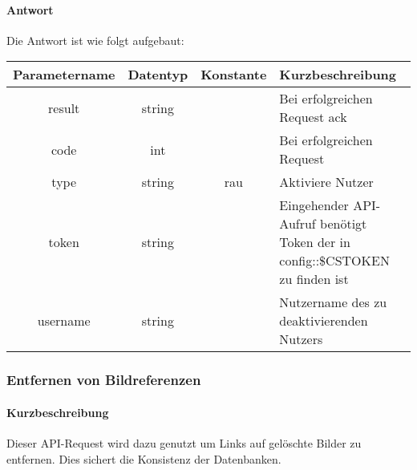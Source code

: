 \paragraph{Antwort}Die Antwort ist wie folgt aufgebaut:
\begin{table}[H]
	\begin{tabular}{|c|c|c|p{6.5cm}|}
		\hline
		\textbf{Parametername} & \textbf{Datentyp} & \textbf{Konstante} & \textbf{Kurzbeschreibung}                                                                                               \\ \hline
		result              & string            &                    & Bei erfolgreichen Request {\glqq ack\grqq}                                                                            \\ \hline
		code                & int               &                    & Bei erfolgreichen Request {\glqq 0\grqq} \\ \hline
		type                & string            & rau                & Aktiviere Nutzer                                                                                                      \\ \hline
		token               & string            &                    & Eingehender API-Aufruf benötigt Token der in config::\$CSTOKEN zu finden ist \\ \hline
		username            & string            &                    & Nutzername des zu deaktivierenden Nutzers                                                                               \\ \hline
	\end{tabular}
\end{table}
\subsubsection{Entfernen von Bildreferenzen}
\paragraph{Kurzbeschreibung}Dieser API-Request wird dazu genutzt um Links auf gelöschte Bilder zu entfernen. Dies sichert die Konsistenz der Datenbanken.
